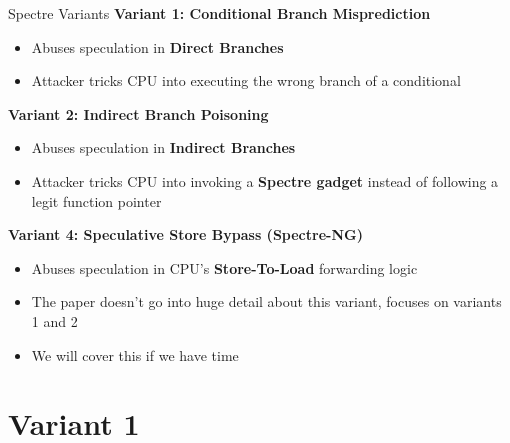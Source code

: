 \documentclass[10pt, dvipsnames, aspectratio=169]{beamer}
\begin{document}
\begin{frame}[c]{Spectre Variants}{}
  {\bf Variant 1: Conditional Branch Misprediction}
  \begin{itemize}
    \item Abuses speculation in {\bf\color{blue}Direct Branches}
    \item Attacker tricks CPU into executing the wrong branch of a conditional
  \end{itemize}

  \vfill
  {\bf Variant 2: Indirect Branch Poisoning}
  \begin{itemize}
    \item Abuses speculation in {\bf\color{orange}Indirect Branches}
    \item Attacker tricks CPU into invoking a {\bf Spectre gadget} instead of following a legit function pointer
  \end{itemize}

  \vfill
  {\bf Variant 4: Speculative Store Bypass (Spectre-NG)}
  \begin{itemize}
    \item Abuses speculation in CPU's {\bf\color{green}Store-To-Load} forwarding logic
    \item The paper doesn't go into huge detail about this variant, focuses on variants 1 and 2
    \item We will cover this if we have time
  \end{itemize}
\end{frame}

\section{Variant 1}
\end{document}
